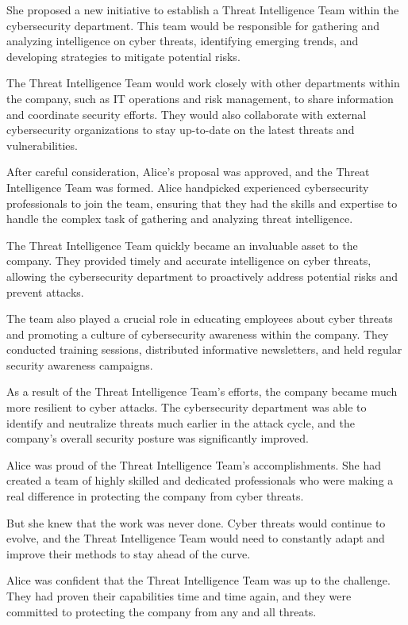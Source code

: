 \documentclass{./StyCls/MyArticle}
\begin{document}
She proposed a new initiative to establish a Threat Intelligence Team within the cybersecurity department. This team would be responsible for gathering and analyzing intelligence on cyber threats, identifying emerging trends, and developing strategies to mitigate potential risks.

The Threat Intelligence Team would work closely with other departments within the company, such as IT operations and risk management, to share information and coordinate security efforts. They would also collaborate with external cybersecurity organizations to stay up-to-date on the latest threats and vulnerabilities.

After careful consideration, Alice's proposal was approved, and the Threat Intelligence Team was formed. Alice handpicked experienced cybersecurity professionals to join the team, ensuring that they had the skills and expertise to handle the complex task of gathering and analyzing threat intelligence.

The Threat Intelligence Team quickly became an invaluable asset to the company. They provided timely and accurate intelligence on cyber threats, allowing the cybersecurity department to proactively address potential risks and prevent attacks.

The team also played a crucial role in educating employees about cyber threats and promoting a culture of cybersecurity awareness within the company. They conducted training sessions, distributed informative newsletters, and held regular security awareness campaigns.

As a result of the Threat Intelligence Team's efforts, the company became much more resilient to cyber attacks. The cybersecurity department was able to identify and neutralize threats much earlier in the attack cycle, and the company's overall security posture was significantly improved.

Alice was proud of the Threat Intelligence Team's accomplishments. She had created a team of highly skilled and dedicated professionals who were making a real difference in protecting the company from cyber threats.

But she knew that the work was never done. Cyber threats would continue to evolve, and the Threat Intelligence Team would need to constantly adapt and improve their methods to stay ahead of the curve.

Alice was confident that the Threat Intelligence Team was up to the challenge. They had proven their capabilities time and time again, and they were committed to protecting the company from any and all threats.
\end{document}
